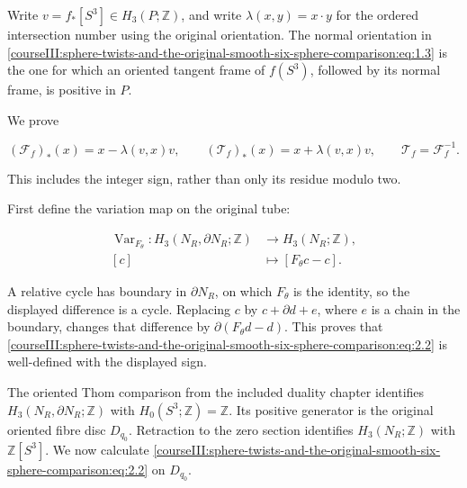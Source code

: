 \label{courseIII:sphere-twists-and-the-original-smooth-six-sphere-comparison:section-2}

Write \(v=f_*[S^3]\in H_3(P;\mathbb Z)\), and write \(\lambda(x,y)=x\cdot y\) for the ordered intersection number using the original orientation. The normal orientation in \eqref{courseIII:sphere-twists-and-the-original-smooth-six-sphere-comparison:eq:1.3} is the one for which an oriented tangent frame of \(f(S^3)\), followed by its normal frame, is positive in \(P\).

We prove

\begin{equation}
(\mathcal F_f)_*(x)=x-\lambda(v,x)v,
       \qquad
       (\mathcal T_f)_*(x)=x+\lambda(v,x)v,
       \qquad \mathcal T_f=\mathcal F_f^{-1}.
 \label{courseIII:sphere-twists-and-the-original-smooth-six-sphere-comparison:eq:2.1}
\end{equation}

This includes the integer sign, rather than only its residue modulo two.

First define the variation map on the original tube:

\begin{equation}
\begin{split}
 \operatorname{Var}_{F_\theta}:H_3(N_R,\partial N_R;\mathbb Z)
       &\longrightarrow H_3(N_R;\mathbb Z),\\
                         {}[c]&\longmapsto[F_\theta c-c].
 \end{split}
 \label{courseIII:sphere-twists-and-the-original-smooth-six-sphere-comparison:eq:2.2}
\end{equation}

A relative cycle has boundary in \(\partial N_R\), on which \(F_\theta\) is the identity, so the displayed difference is a cycle. Replacing \(c\) by \(c+\partial d+e\), where \(e\) is a chain in the boundary, changes that difference by \(\partial(F_\theta d-d)\). This proves that \eqref{courseIII:sphere-twists-and-the-original-smooth-six-sphere-comparison:eq:2.2} is well-defined with the displayed sign.

The oriented Thom comparison from the included duality chapter identifies \(H_3(N_R,\partial N_R;\mathbb Z)\) with \(H_0(S^3;\mathbb Z)=\mathbb Z\). Its positive generator is the original oriented fibre disc \(D_{q_0}\). Retraction to the zero section identifies \(H_3(N_R;\mathbb Z)\) with \(\mathbb Z[S^3]\). We now calculate \eqref{courseIII:sphere-twists-and-the-original-smooth-six-sphere-comparison:eq:2.2} on \(D_{q_0}\).

